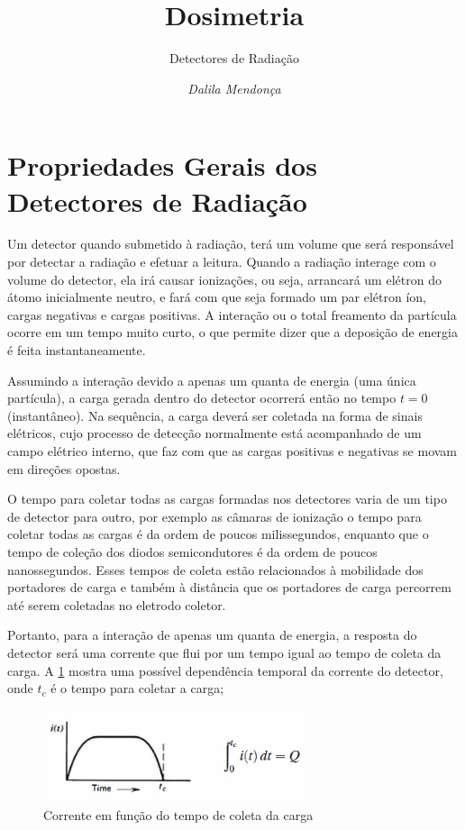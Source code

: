 \documentclass[11pt,a4paper]{article}
\title{Dosimetria}
\author{Detectores de Radiação\nocite{*}}
\date{\textit{Dalila Mendonça}}
\newcounter{exemplo}
\begin{document}
	\maketitle

\section{Propriedades Gerais dos Detectores de Radiação}

    Um detector quando submetido à radiação, terá um volume que será responsável por detectar a radiação e efetuar a leitura. Quando a radiação interage com o volume do detector, ela irá causar ionizações, ou seja, arrancará um elétron do átomo inicialmente neutro, e fará com que seja formado um par elétron íon, cargas negativas e cargas positivas. A interação ou o total freamento da partícula ocorre em um tempo muito curto, o que permite dizer que a deposição de energia é feita instantaneamente. 

    Assumindo a interação devido a apenas um quanta de energia (uma única partícula), a carga gerada dentro do detector ocorrerá então no tempo $t = 0$ (instantâneo). Na sequência, a carga deverá ser coletada na forma de sinais elétricos, cujo processo de detecção normalmente está acompanhado de um campo elétrico interno, que faz com que as cargas positivas e negativas se movam em direções opostas. 

    O tempo para coletar todas as cargas formadas nos detectores varia de um tipo de detector para outro, por exemplo as câmaras de ionização o tempo para coletar todas as cargas é da ordem de poucos milissegundos, enquanto que o tempo de coleção dos  diodos semicondutores é da ordem de poucos nanossegundos. Esses tempos de coleta estão relacionados à mobilidade dos portadores de carga e também à distância que os portadores de carga percorrem até serem coletadas no eletrodo coletor.

    Portanto, para a interação de apenas um quanta de energia, a resposta do detector será uma corrente que flui por um tempo igual ao tempo de coleta da carga. A  \ref{fig:esquemaTempoColetaCorrente} mostra uma possível dependência temporal da corrente do detector, onde $t_c$ é o tempo para coletar a carga;

        \begin{figure}[h]
            \centering
            \includegraphics[width=0.7\textwidth]{Imagens/esquemaTempoColetaCorrente.jpg}
            \caption{Corrente em função do tempo de coleta da carga}
            \label{fig:esquemaTempoColetaCorrente}
        \end{figure}
\end{document}
